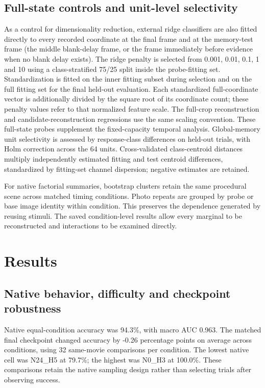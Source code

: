 \documentclass[11pt]{article}
\begin{document}
\subsection{Full-state controls and unit-level selectivity}
As a control for dimensionality reduction, external ridge classifiers are also fitted directly to every recorded coordinate at the final frame and at the memory-test frame (the middle blank-delay frame, or the frame immediately before evidence when no blank delay exists). The ridge penalty is selected from 0.001, 0.01, 0.1, 1 and 10 using a class-stratified 75/25 split inside the probe-fitting set. Standardization is fitted on the inner fitting subset during selection and on the full fitting set for the final held-out evaluation. Each standardized full-coordinate vector is additionally divided by the square root of its coordinate count; these penalty values refer to that normalized feature scale. The full-crop reconstruction and candidate-reconstruction regressions use the same scaling convention. These full-state probes supplement the fixed-capacity temporal analysis. Global-memory unit selectivity is assessed by response-class differences on held-out trials, with Holm correction across the 64 units. Cross-validated class-centroid distances multiply independently estimated fitting and test centroid differences, standardized by fitting-set channel dispersion; negative estimates are retained.

For native factorial summaries, bootstrap clusters retain the same procedural scene across matched timing conditions. Photo repeats are grouped by probe or base image identity within condition. This preserves the dependence generated by reusing stimuli. The saved condition-level results allow every marginal to be reconstructed and interactions to be examined directly.
\section{Results}
\subsection{Native behavior, difficulty and checkpoint robustness}
Native equal-condition accuracy was 94.3\%, with macro AUC 0.963. The matched final checkpoint changed accuracy by -0.26 percentage points on average across conditions, using 32 same-movie comparisons per condition. The lowest native cell was N24\_\allowbreak{}H5 at 79.7\%; the highest was N0\_\allowbreak{}H3 at 100.0\%. These comparisons retain the native sampling design rather than selecting trials after observing success.
\end{document}
